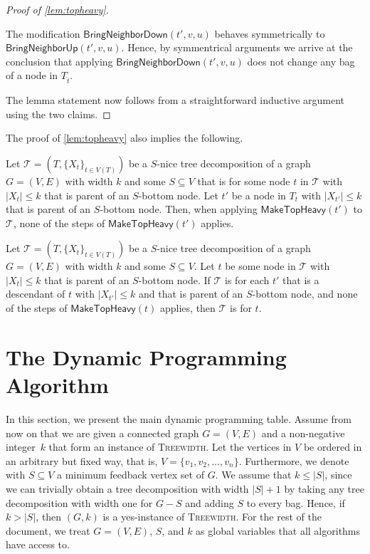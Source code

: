 \documentclass[a4paper,UKenglish,cleveref, autoref, thm-restate, numberwithinsect]{lipics-v2021}
\newcounter{modification}
\newcounter{algorithm}
\newcommand{\slim}{\text{slim}\xspace}
\newcommand{\topheavy}{\text{top-heavy}\xspace}
\newcommand{\BringNeighborUp}{\mathsf{BringNeighborUp}}
\newcommand{\BringNeighborDown}{\mathsf{BringNeighborDown}}
\newcommand{\MakeTopHeavy}{\mathsf{MakeTopHeavy}}
\begin{document}
\begin{proof}[Proof of \cref{lem:topheavy}]
\begin{claimproof}
The modification $\BringNeighborDown(t', v, u)$ behaves symmetrically to $\BringNeighborUp(t', v, u)$. Hence, by symmentrical arguments we arrive at the conclusion that applying $\BringNeighborDown(t', v, u)$ does not change any bag of a node in $T_{\hat{t}}$.
\end{claimproof}
The lemma statement now follows from a straightforward inductive argument using the two claims.
\end{proof}

The proof of \cref{lem:topheavy} also implies the following.
\begin{lemma}\label{lem:topheavynomake}
Let $\mathcal{T}=(T,\{X_t\}_{t\in V(T)})$ be a \slim $S$-nice tree decomposition of a graph $G=(V,E)$ with width $k$ and some $S\subseteq V$ that is \topheavy for some node $t$ in $\mathcal{T}$ with $|X_t|\le k$ that is parent of an $S$-bottom node. Let $t'$ be a node in $T_t$ with $|X_{t'}|\le k$ that is parent of an $S$-bottom node.
Then, when applying $\MakeTopHeavy(t')$ to $\mathcal{T}$, none of the steps of $\MakeTopHeavy(t')$ applies.
\end{lemma}

\begin{lemma}\label{lem:topheavynomake2}
Let $\mathcal{T}=(T,\{X_t\}_{t\in V(T)})$ be a \slim $S$-nice tree decomposition of a graph $G=(V,E)$ with width $k$ and some $S\subseteq V$. Let $t$ be some node in $\mathcal{T}$ with $|X_t|\le k$ that is parent of an $S$-bottom node. 
If $\mathcal{T}$ is \topheavy for each $t'$ that is a descendant of $t$ with $|X_{t'}|\le k$ and that is parent of an $S$-bottom node, and none of the steps of $\MakeTopHeavy(t)$ applies, then $\mathcal{T}$ is \topheavy for $t$.
\end{lemma}

\section{The Dynamic Programming Algorithm}\label{sec:mainalgo}
In this section, we present the main dynamic programming table.
Assume from now on that we are given a connected graph $G=(V,E)$ and a non-negative integer~$k$ that form an instance of \textsc{Treewidth}.
Let the vertices in $V$ be ordered in an arbitrary but fixed way, that is, $V=\{v_1,v_2,\ldots,v_{n}\}$.
Furthermore, we denote with $S\subseteq V$ a minimum feedback vertex set of $G$. We assume that $k\le |S|$, since we can trivially obtain a tree decomposition with width $|S|+1$ by taking any tree decomposition with width one for $G-S$ and adding $S$ to every bag. Hence, if $k>|S|$, then $(G,k)$ is a yes-instance of \textsc{Treewidth}. For the rest of the document, we treat $G=(V,E)$, $S$, and $k$ as global variables that all algorithms have access to.
\end{document}
